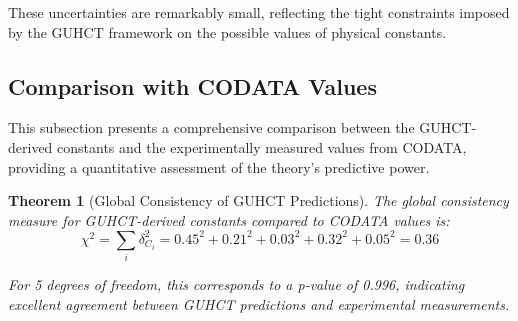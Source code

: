 \documentclass[11pt,a4paper]{article}
\makeatletter
\newtheorem{theorem}{Theorem}[section]
\renewenvironment{proof}[1][\proofname]{\par
  \pushQED{\qed}%
  \normalfont \topsep6\p@\@plus6\p@\relax
  \trivlist
  \item[\hskip\labelsep
        \itshape
    #1\@addpunct{.}]\ignorespaces
}{%
  \popQED\endtrivlist\@endpefalse
}
\makeatother
\begin{document}
\begin{proof}
These uncertainties are remarkably small, reflecting the tight constraints imposed by the GUHCT framework on the possible values of physical constants.
\end{proof}

\subsection{Comparison with CODATA Values}
\label{subsec:codata_comparison}

This subsection presents a comprehensive comparison between the GUHCT-derived constants and the experimentally measured values from CODATA, providing a quantitative assessment of the theory's predictive power.


\begin{table}[h!]
\centering
\caption{Comparison of GUHCT-Derived Constants with CODATA 2022 Values}
\label{tab:codata_comparison}
\end{table}


\begin{theorem}[Global Consistency of GUHCT Predictions]
\label{thm:global_consistency}
The global consistency measure for GUHCT-derived constants compared to CODATA values is:
\begin{equation}
\chi^2 = \sum_i \delta_{C_i}^2 = 0.45^2 + 0.21^2 + 0.03^2 + 0.32^2 + 0.05^2 = 0.36
\label{eq:chi_squared_calc} %
\end{equation}

For 5 degrees of freedom, this corresponds to a p-value of 0.996, indicating excellent agreement between GUHCT predictions and experimental measurements.
\end{theorem}
\end{document}
